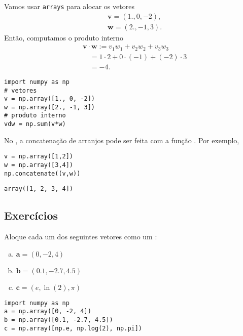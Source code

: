 \begin{ex}
  Vamos usar \texttt{arrays} para alocar os vetores
  \begin{align}
    & \pmb{v} = (1., 0, -2),\\
    & \pmb{w} = (2., -1, 3).
  \end{align}
  Então, computamos o produto interno
  \begin{align}
    & \pmb{v}\cdot\pmb{w} := v_1w_1 + v_2w_2 + v_3w_3 \\
    & \text{}\quad = 1\cdot 2 + 0\cdot(-1) + (-2)\cdot 3 \\
    & \text{}\quad = -4.
  \end{align}

\begin{lstlisting}
import numpy as np
# vetores
v = np.array([1., 0, -2])
w = np.array([2., -1, 3])
# produto interno
vdw = np.sum(v*w)
\end{lstlisting}

\end{ex}

\begin{obs}
  No {\numpy}, a concatenação de arranjos pode ser feita com a função {\PYTHONnumpyDOTconcatenate}. Por exemplo,

\begin{lstlisting}
v = np.array([1,2])
w = np.array([3,4])
np.concatenate((v,w))
\end{lstlisting}

\begin{verbatim}
array([1, 2, 3, 4])
\end{verbatim}

\end{obs}

\subsection{Exercícios}

\begin{exer}
  Aloque cada um dos seguintes vetores como um {\PYTHONnumpyDOTarray}:
  \begin{enumerate}[a)]
  \item $\displaystyle\pmb{a} = (0, -2, 4)$
  \item $\displaystyle\pmb{b} = (0.1, -2.7, 4.5)$
  \item $\displaystyle\pmb{c} = (e, \ln(2), \pi)$
  \end{enumerate}
\end{exer}
\begin{resp}

\begin{lstlisting}
import numpy as np
a = np.array([0, -2, 4])
b = np.array([0.1, -2.7, 4.5])
c = np.array([np.e, np.log(2), np.pi])
\end{lstlisting}

\end{resp}

